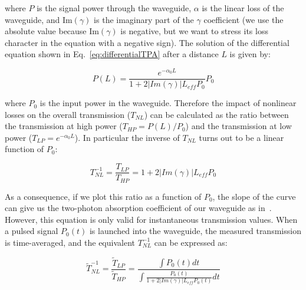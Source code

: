 \documentclass[10pt,letterpaper]{article}
\begin{document}
where $P$ is the signal power through the waveguide, $\alpha$ is the linear loss of the waveguide, and Im$(\gamma)$ is the imaginary part of the $\gamma$ coefficient (we use the absolute value because Im$(\gamma)$ is negative, but we want to stress its loss character in the equation with a negative sign). 
The solution of the differential equation shown in Eq.~\ref{eq:differentialTPA} after a distance $L$ is given by:

                                                                \begin{equation}
                                                                         P(L) = \frac{e^{-\alpha_0 L}}{1+2|Im(\gamma)| L_{eff} P_0} P_0
                                                                \end{equation}

where $P_0$ is the input power in the waveguide. Therefore the impact of nonlinear losses on the overall transmission ($T_{NL}$) can be calculated as the ratio between the transmission at high power ($T_{HP} = P(L)/P_0 $) and the transmission at low power ($T_{LP} = e^{-\alpha_0 L} $). In particular the inverse of $T_{NL}$ turns out to be a linear function of $P_0$:

                                                                \begin{equation}
                                                                         T_{NL}^{-1} = \frac{T_{LP}}{T_{HP}} = 1+2|Im(\gamma)| L_{eff} P_0
                                                                        \label{eq:transmissionLinear}
                                                                \end{equation}

As a consequence, if we plot this ratio as a function of $P_0$, the slope of the curve can give us the two-photon absorption coefficient of our waveguide as in~\cite{Vallaitis2009}.
However, this equation is only valid for instantaneous transmission values. When a pulsed signal $P_0(t)$ is launched into the waveguide, the measured transmission is time-averaged, and the equivalent $T_{NL}^{-1}$ can be expressed as:

                                                                \begin{equation}
                                                                        \tilde{T}_{NL}^{-1} = \frac{\tilde{T}_{LP}}{\tilde{T}_{HP}} = \frac{\int P_0(t)dt}{\int \frac{P_0(t)}{1+2|Im(\gamma)| L_{eff} P_0(t)} dt}
                                                                        \label{eq:transmissionIntegral}
                                                                \end{equation}
\end{document}
